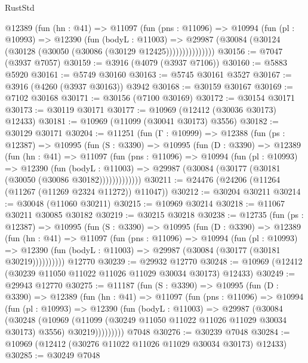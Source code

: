 \begin{lexlean}{RustStd}
\begin{coremodule}
            @12389
              (fun (hn : @41) =>
              @11097
                (fun (pns : @11096) =>
                @10994
                  (fun (pl : @10993) =>
                  @12390
                    (fun (bodyL : @11003) =>
                    @29987 (@30084 (@30124 (@30128 (@30050 (@30086 (@30129 @12425)))))))))))))))
@30156 := @7047 (@3937 @7057)
@30159 := @3916 (@4079 (@3937 @7106))
@30160 := @5883 @5920
@30161 := @5749 @30160
@30163 := @5745 @30161 @3527
@30167 := @3916 (@4260 (@3937 @30163)) @3942
@30168 := @30159 @30167
@30169 := @7102 @30168
@30171 := @30156 (@7100 @30169)
@30172 := @30154 @30171
@30173 := @30119 @30171
@30177 := @10969 (@12412 (@30036 @30173) @12433)
@30181 := @10969 (@11099 (@30041 @30173) @3556)
@30182 := @30129 @30171
@30204 := @11251
    (fun (Γ : @10999) =>
    @12388
      (fun (ps : @12387) =>
      @10995
        (fun (S : @3390) =>
        @10995
          (fun (D : @3390) =>
          @12389
            (fun (hn : @41) =>
            @11097
              (fun (pns : @11096) =>
              @10994
                (fun (pl : @10993) =>
                @12390
                  (fun (bodyL : @11003) =>
                  @29987 (@30084 (@30177 (@30181 (@30050 (@30086 @30182)))))))))))))
@30211 := @24476 (@24206 (@11264 (@11267 (@11269 @2324 @11272)) @11047))
@30212 := @30204 @30211
@30214 := @30048 (@11060 @30211)
@30215 := @10969 @30214
@30218 := @11067 @30211 @30085 @30182
@30219 := @30215 @30218
@30238 := @12735
    (fun (ps : @12387) =>
    @10995
      (fun (S : @3390) =>
      @10995
        (fun (D : @3390) =>
        @12389
          (fun (hn : @41) =>
          @11097
            (fun (pns : @11096) =>
            @10994
              (fun (pl : @10993) =>
              @12390 (fun (bodyL : @11003) => @29987 (@30084 (@30177 (@30181 @30219))))))))))
    @12770
@30239 := @29932 @12770
@30248 := @10969 (@12412 (@30239 @11050 @11022 @11026 @11029 @30034 @30173) @12433)
@30249 := @29943 @12770
@30275 := @11187
    (fun (S : @3390) =>
    @10995
      (fun (D : @3390) =>
      @12389
        (fun (hn : @41) =>
        @11097
          (fun (pns : @11096) =>
          @10994
            (fun (pl : @10993) =>
            @12390
              (fun (bodyL : @11003) =>
              @29987
                (@30084
                  (@30248
                    (@10969
                      (@11099 (@30249 @11050 @11022 @11026 @11029 @30034 @30173) @3556)
                      @30219)))))))))
    @7048
@30276 := @30239 @7048
@30284 := @10969 (@12412 (@30276 @11022 @11026 @11029 @30034 @30173) @12433)
@30285 := @30249 @7048

\end{coremodule}
\end{lexlean}
